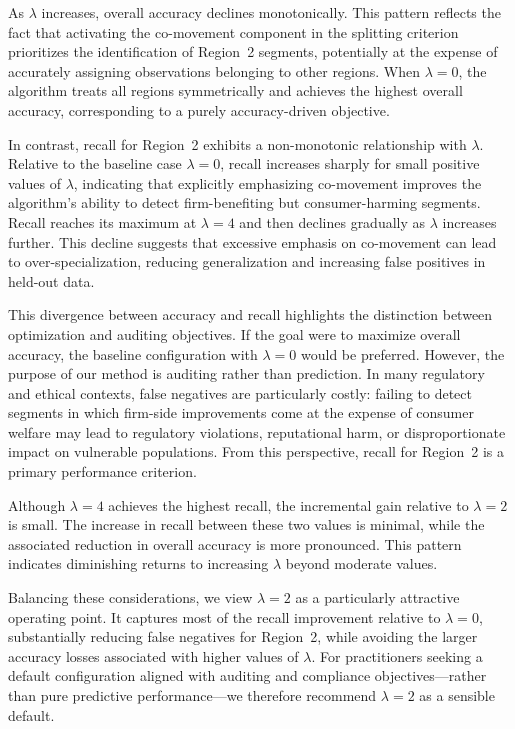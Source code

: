 \documentclass[11pt,letterpaper,english]{article}
\theoremstyle{definition}
\theoremstyle{definition}
\begin{document}
\begin{bibunit}
As $\lambda$ increases, overall accuracy declines monotonically. This pattern reflects the fact that activating the co-movement component in the splitting criterion prioritizes the identification of Region~2 segments, potentially at the expense of accurately assigning observations belonging to other regions. When $\lambda = 0$, the algorithm treats all regions symmetrically and achieves the highest overall accuracy, corresponding to a purely accuracy-driven objective.

In contrast, recall for Region~2 exhibits a non-monotonic relationship with $\lambda$. Relative to the baseline case $\lambda = 0$, recall increases sharply for small positive values of $\lambda$, indicating that explicitly emphasizing co-movement improves the algorithm’s ability to detect firm-benefiting but consumer-harming segments. Recall reaches its maximum at $\lambda = 4$ and then declines gradually as $\lambda$ increases further. This decline suggests that excessive emphasis on co-movement can lead to over-specialization, reducing generalization and increasing false positives in held-out data.

This divergence between accuracy and recall highlights the distinction between optimization and auditing objectives. If the goal were to maximize overall accuracy, the baseline configuration with $\lambda = 0$ would be preferred. However, the purpose of our method is auditing rather than prediction. In many regulatory and ethical contexts, false negatives are particularly costly: failing to detect segments in which firm-side improvements come at the expense of consumer welfare may lead to regulatory violations, reputational harm, or disproportionate impact on vulnerable populations. From this perspective, recall for Region~2 is a primary performance criterion.

Although $\lambda = 4$ achieves the highest recall, the incremental gain relative to $\lambda = 2$ is small. The increase in recall between these two values is minimal, while the associated reduction in overall accuracy is more pronounced. This pattern indicates diminishing returns to increasing $\lambda$ beyond moderate values.

Balancing these considerations, we view $\lambda = 2$ as a particularly attractive operating point. It captures most of the recall improvement relative to $\lambda = 0$, substantially reducing false negatives for Region~2, while avoiding the larger accuracy losses associated with higher values of $\lambda$. For practitioners seeking a default configuration aligned with auditing and compliance objectives—rather than pure predictive performance—we therefore recommend $\lambda = 2$ as a sensible default.


\end{bibunit}
\end{document}
